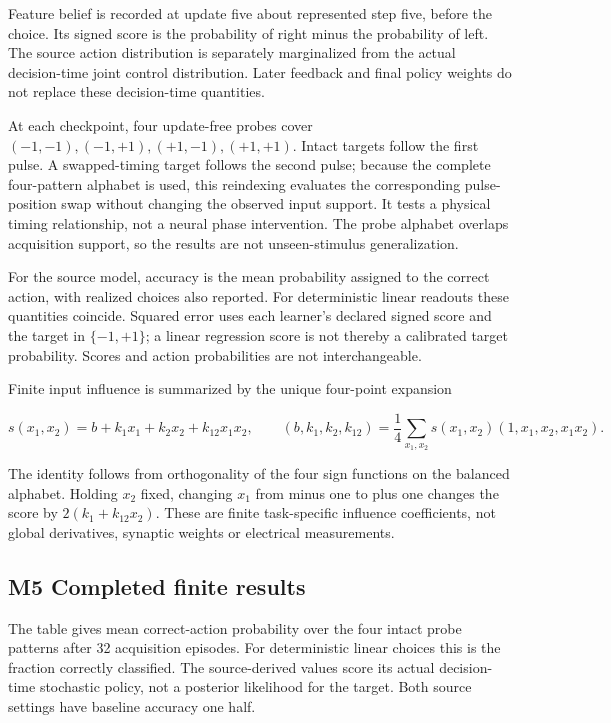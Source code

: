 \documentclass[
  american,
  11pt,
  letterpaper,
]{article}
\begin{document}
Feature belief is recorded at update five about represented step five, before the choice. Its signed score is the probability of right minus the probability of left. The source action distribution is separately marginalized from the actual decision-time joint control distribution. Later feedback and final policy weights do not replace these decision-time quantities.

At each checkpoint, four update-free probes cover \((-1,-1),(-1,+1),(+1,-1),(+1,+1)\). Intact targets follow the first pulse. A swapped-timing target follows the second pulse; because the complete four-pattern alphabet is used, this reindexing evaluates the corresponding pulse-position swap without changing the observed input support. It tests a physical timing relationship, not a neural phase intervention. The probe alphabet overlaps acquisition support, so the results are not unseen-stimulus generalization.

For the source model, accuracy is the mean probability assigned to the correct action, with realized choices also reported. For deterministic linear readouts these quantities coincide. Squared error uses each learner's declared signed score and the target in \(\{-1,+1\}\); a linear regression score is not thereby a calibrated target probability. Scores and action probabilities are not interchangeable.

Finite input influence is summarized by the unique four-point expansion

\begin{equation}
s(x_1,x_2)=b+k_1x_1+k_2x_2+k_{12}x_1x_2,
\qquad
(b,k_1,k_2,k_{12})=\frac14\sum_{x_1,x_2}s(x_1,x_2)(1,x_1,x_2,x_1x_2).
\tag{M3}
\end{equation}

The identity follows from orthogonality of the four sign functions on the balanced alphabet. Holding \(x_2\) fixed, changing \(x_1\) from minus one to plus one changes the score by \(2(k_1+k_{12}x_2)\). These are finite task-specific influence coefficients, not global derivatives, synaptic weights or electrical measurements.

\par

\ifdim\dimexpr\pagegoal-\pagetotal\relax<180pt\newpage\fi \subsection*{M5 Completed finite results}

The table gives mean correct-action probability over the four intact probe patterns after 32 acquisition episodes. For deterministic linear choices this is the fraction correctly classified. The source-derived values score its actual decision-time stochastic policy, not a posterior likelihood for the target. Both source settings have baseline accuracy one half.
\end{document}
